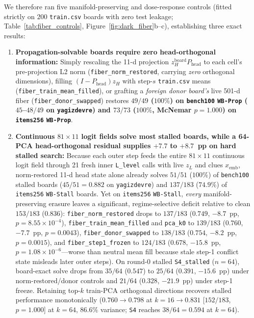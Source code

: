 \documentclass[10pt,letterpaper]{article}
\newcommand{\Phead}{P_{\mathrm{head}}}
\begin{document}
We therefore ran five manifold-preserving and dose-response controls (fitted strictly on $200$ \texttt{train.csv} boards with zero test leakage; Table~\ref{tab:fiber_controls}, Figure~\ref{fig:dark_fiber}b--c), establishing three exact results:
\begin{enumerate}[topsep=3pt,itemsep=2pt]
  \item \textbf{Propagation-solvable boards require zero head-orthogonal information:} Simply rescaling the 11-d projection $z_H^{\mathrm{board}}\Phead$ to each cell's pre-projection L2 norm (\texttt{fiber\_norm\_restored}, carrying \emph{zero} orthogonal dimensions), filling $(I-\Phead)z_H$ with step-$s$ \texttt{train.csv} means (\texttt{fiber\_train\_mean\_filled}), or grafting a \emph{foreign donor board's} live 501-d fiber (\texttt{fiber\_donor\_swapped}) restores \textbf{$49/49$ ($100\%$) on \texttt{bench100} \texttt{WB-Prop} ($45$--$48/49$ on \texttt{yagizdevre}) and $73/73$ ($100\%$, McNemar $p=1.000$) on \texttt{items256} \texttt{WB-Prop}}.
  \item \textbf{Continuous $81\times 11$ logit fields solve most stalled boards, while a 64-PCA head-orthogonal residual supplies $+7.7$ to $+8.7$~pp on hard stalled search:} Because each outer step feeds the entire $81\times 11$ continuous logit field through 21 fresh inner \texttt{L\_level} calls with live $z_L$ and clues $x_{\mathrm{emb}}$, norm-restored 11-d head state alone already solves $51/51$ ($100\%$) of \texttt{bench100} stalled boards ($45/51 = 0.882$ on \texttt{yagizdevre}) and $137/183$ ($74.9\%$) of \texttt{items256} \texttt{WB-Stall} boards. Yet on \texttt{items256} \texttt{WB-Stall}, \emph{every} manifold-preserving erasure leaves a significant, regime-selective deficit relative to clean $153/183$ ($0.836$): \texttt{fiber\_norm\_restored} drops to $137/183$ ($0.749$, $-8.7$~pp, $p=8.55\times 10^{-4}$), \texttt{fiber\_train\_mean\_filled} and \texttt{pca\_k0} to $139/183$ ($0.760$, $-7.7$~pp, $p=0.0043$), \texttt{fiber\_donor\_swapped} to $138/183$ ($0.754$, $-8.2$~pp, $p=0.0015$), and \texttt{fiber\_step1\_frozen} to $124/183$ ($0.678$, $-15.8$~pp, $p=1.08\times 10^{-6}$—worse than neutral mean fill because stale step-1 conflict state misleads later outer steps). On round-0 stalled \texttt{S4\_stalled} ($n=64$), board-exact solve drops from $35/64$ ($0.547$) to $25/64$ ($0.391$, $-15.6$~pp) under norm-restored/donor controls and $21/64$ ($0.328$, $-21.9$~pp) under step-1 freeze. Retaining top-$k$ train-PCA orthogonal directions recovers stalled performance monotonically ($0.760 \to 0.798$ at $k=16 \to \mathbf{0.831}$ [$152/183$, $p=1.000$] at $k=64$, $86.6\%$ variance; \texttt{S4} reaches $38/64 = 0.594$ at $k=64$).

\end{enumerate}
\end{document}
